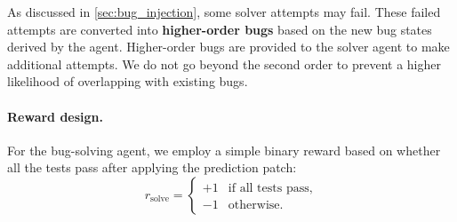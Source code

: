 As discussed in \cref{sec:bug_injection}, some solver attempts may fail. These failed attempts are converted into \textbf{higher-order bugs} based on the new bug states derived by the agent.
Higher-order bugs are provided to the solver agent to make additional attempts.
We do not go beyond the second order to prevent a higher likelihood of overlapping with existing bugs.


\paragraph{Reward design.}
For the bug-solving agent, we employ a simple binary reward based on whether all the tests pass after applying the prediction patch:
\begin{equation}
r_{\text{solve}} = \begin{cases}
+1 & \text{if all tests pass,} \\
-1 & \text{otherwise.}
\end{cases}
\end{equation}



